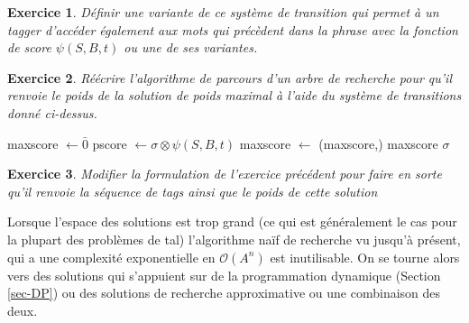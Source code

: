 \documentclass[11pt,openany]{book}
\newtheorem{exo}{Exercice}[chapter]
\newcommand{\ac}[1]{{\sc #1}} %
\begin{document}
\begin{exo}
Définir une variante de ce système de transition qui permet à un tagger d'accéder également aux mots qui précèdent dans la phrase avec la fonction de score $\psi(S,B,t)$ ou une de ses variantes. 
\end{exo}
\begin{exo}
Réécrire l'algorithme de parcours d'un arbre de recherche pour qu'il renvoie le poids de la solution de poids maximal à l'aide du système de transitions donné ci-dessus.
\end{exo}
\begin{solution}
\begin{algorithmic}
\State maxscore $\gets \bar{0}$
\State pscore $\gets \sigma \otimes \psi(S,B,t)$ 
\State maxscore $\gets$ \Call{$\oplus$}{}(maxscore,)
\EndFor
\State\Return maxscore
\Else
\State\Return $\sigma$
\EndIf
\EndFunction
\end{algorithmic}
\end{solution}
\begin{exo}
Modifier la formulation de l'exercice précédent pour faire en sorte qu'il renvoie la séquence de tags ainsi que le poids de cette solution
\end{exo}

Lorsque l'espace des solutions est trop grand (ce qui est généralement le cas pour la plupart des problèmes de \ac{tal}) l'algorithme naïf de recherche vu jusqu'à présent, qui a une complexité exponentielle en $\mathcal{O}(A^n)$ est inutilisable. On se tourne alors vers des solutions qui s'appuient sur de la programmation dynamique (Section \ref{sec-DP}) ou des solutions  de recherche approximative ou une combinaison des deux.
\end{document}
